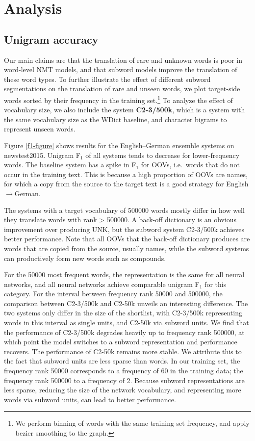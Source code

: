 \section{Analysis}
\label{sec-analysis}

\subsection{Unigram accuracy}

Our main claims are that the translation of rare and unknown words is poor in word-level NMT models, and that subword models improve the translation of these word types. To further illustrate the effect of different subword segmentations on the translation of rare and unseen words, we plot target-side words sorted by their frequency in the training set.\footnote{We perform binning of words with the same training set frequency, and apply bezier smoothing to the graph.} To analyze the effect of vocabulary size, we also include the system \textbf{C2-3/500k}, which is a system with the same vocabulary size as the WDict baseline, and character bigrams to represent unseen words.

Figure \ref{f1-figure} shows results for the English--German ensemble systems on newstest2015. Unigram F$_1$ of all systems tends to decrease for lower-frequency words. The baseline system has a spike in F$_1$ for OOVs, i.e.\ words that do not occur in the training text. This is because a high proportion of OOVs are names, for which a copy from the source to the target text is a good strategy for English$\to$German.

The systems with a target vocabulary of \num{500000} words mostly differ in how well they translate words with rank > \num{500000}.
A back-off dictionary is an obvious improvement over producing UNK, but the subword system C2-3/500k achieves better performance. Note that all OOVs that the back-off dictionary produces are words that are copied from the source, usually names, while the subword systems can productively form new words such as compounds.

For the \num{50000} most frequent words, the representation is the same for all neural networks, and all neural networks achieve comparable unigram F$_1$ for this category. For the interval between frequency rank \num{50000} and \num{500000}, the comparison between C2-3/500k and C2-50k unveils an interesting difference. The two systems only differ in the size of the shortlist, with C2-3/500k representing words in this interval as single units, and C2-50k via subword units. We find that the performance of C2-3/500k degrades heavily up to frequency rank \num{500000}, at which point the model switches to a subword representation and performance recovers. The performance of C2-50k remains more stable. We attribute this to the fact that subword units are less sparse than words. In our training set, the frequency rank \num{50000} corresponds to a frequency of 60 in the training data; the frequency rank \num{500000} to a frequency of 2. Because subword representations are less sparse, reducing the size of the network vocabulary, and representing more words via subword units, can lead to better performance.

